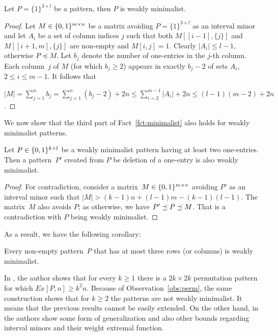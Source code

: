 \begin{fct}
\label{fct:3weak}
Let $P=\{1\}^{3\times l}$ be a pattern, then $P$ is weakly minimalist.
\end{fct}
\begin{proof}
Let $M\in\{0,1\}^{m\times n}$ be a matrix avoiding $P=\{1\}^{3\times l}$ as an interval minor and let $A_i$ be a set of column indices $j$ such that both $M[[i-1],\{j\}]$ and $M[[i+1,m],\{j\}]$ are non-empty and $M[i,j]=1$. Clearly $|A_i|\leq l-1$, otherwise $P\preceq M$. Let $b_j$ denote the number of one-entries in the $j$-th column. Each column~$j$ of $M$ (for which $b_j\geq2$) appears in exactly $b_j-2$ of sets $A_i$, $2\leq i\leq m-1$. It follows that

$|M|=\sum\limits_{j=1}^nb_j=\sum\limits_{j=1}^n(b_j-2)+2n\leq\sum\limits_{i=2}^{m-1}|A_i|+2n\leq(l-1)(m-2)+2n$.
\end{proof}

We now show that the third part of Fact~\ref{fct:minimalist} also holds for weakly minimalist patterns.

\begin{lemma}
Let $P\in\{0,1\}^{k\times l}$ be a weakly minimalist pattern having at least two one-entries. Then a pattern~$P'$ created from $P$ be deletion of a one-entry is also weakly minimalist.
\end{lemma}
\begin{proof}
For contradiction, consider a matrix~$M\in\{0,1\}^{m\times n}$ avoiding $P'$ as an interval minor such that $|M|>(k-1)n+(l-1)m-(k-1)(l-1)$. The matrix~$M$ also avoids $P$; as otherwise, we have $P'\preceq P\preceq M$. That is a contradiction with $P$ being weakly minimalist. 
\end{proof}

As a result, we have the following corollary:

\begin{cor}
Every non-empty pattern~$P$ that has at most three rows (or columns) is weakly minimalist.
\end{cor}

In \cite{cibulka09}, the author shows that for every $k\geq1$ there is a $2k\times2k$ permutation pattern for which $Ex[P,n]\geq k^2n$. Because of Observation~\ref{obs:perm}, the same construction shows that for $k\geq2$ the patterns are not weakly minimalist. It means that the previous results cannot be easily extended. On the other hand, in \cite{multipartite} the authors show some form of generalization and also other bounds regarding interval minors and their weight extremal function.